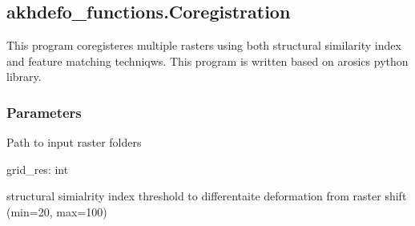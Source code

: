 \documentclass[letterpaper,10pt]{sphinxmanual}
\begin{document}
\sphinxstepscope


\subsection{akhdefo\_functions.Coregistration}
\label{\detokenize{generated/akhdefo_functions.Coregistration:akhdefo-functions-coregistration}}\label{\detokenize{generated/akhdefo_functions.Coregistration::doc}}

\begin{fulllineitems}
\label{\detokenize{generated/akhdefo_functions.Coregistration:akhdefo_functions.Coregistration}}
\pysigstartsignatures
{}
\pysigstopsignatures
\sphinxAtStartPar
This program coregisteres multiple rasters using both structural similarity index and feature matching techniqws.
This program is written based on arosics python library.


\subsubsection{Parameters}
\label{\detokenize{generated/akhdefo_functions.Coregistration:parameters}}\begin{description}
\sphinxAtStartPar
Path to input raster folders

\end{description}

\sphinxAtStartPar
grid\_res: int
\begin{description}
\sphinxAtStartPar
structural simialrity index threshold to differentaite deformation from raster shift (min=20, max=100)


\end{description}
\end{fulllineitems}
\end{document}
